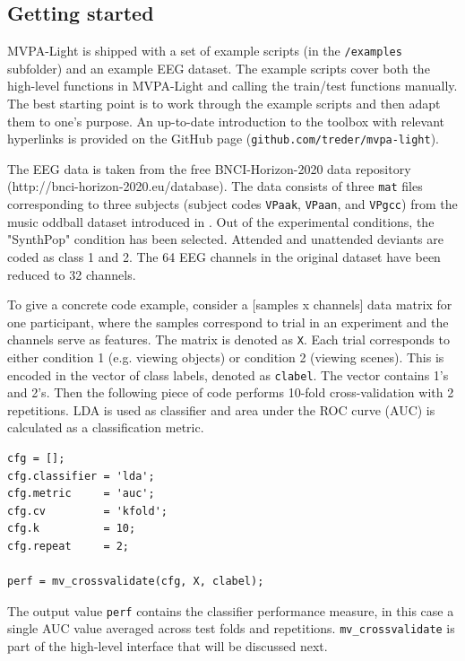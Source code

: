 \documentclass[utf8]{frontiersSCNS} %
\newcommand{\ttt}[1]{\texttt{#1}}
\begin{document}
\subsection{Getting started}

MVPA-Light is shipped with a set of example scripts (in the \ttt{/examples} subfolder) and an example EEG dataset. The example scripts cover both the high-level functions in MVPA-Light and calling the train/test functions manually. The best starting point is to work through the example scripts and then adapt them to one's purpose. An up-to-date introduction to the toolbox with relevant hyperlinks is provided on the GitHub page (\ttt{github.com/treder/mvpa-light}).

The EEG data is taken from the free BNCI-Horizon-2020 data repository (http://bnci-horizon-2020.eu/database). The data consists of three \ttt{mat} files corresponding to three subjects (subject codes \ttt{VPaak}, \ttt{VPaan}, and \ttt{VPgcc}) from the music oddball dataset introduced in \cite{Treder2014}. Out of the experimental conditions, the "SynthPop" condition has been selected. Attended and unattended deviants are coded as class 1 and 2. The 64 EEG channels in the original dataset have been reduced to 32 channels.

To give a concrete code example, consider a [samples x channels] data matrix for one participant, where the samples correspond to trial in an experiment and the channels serve as features. The matrix is denoted as \ttt{X}. Each trial corresponds to either condition 1 (e.g. viewing objects) or condition 2 (viewing scenes). This is encoded in the vector of class labels, denoted as \ttt{clabel}. The vector contains 1's and 2's. Then the following piece of code performs 10-fold cross-validation with 2 repetitions. LDA is used as classifier and area under the ROC curve (AUC) is calculated as a classification metric.

\begin{verbatim}
cfg = [];
cfg.classifier = 'lda';
cfg.metric     = 'auc';
cfg.cv         = 'kfold';
cfg.k          = 10;
cfg.repeat     = 2;

perf = mv_crossvalidate(cfg, X, clabel);
\end{verbatim}

The output value \ttt{perf} contains the classifier performance measure, in this case a single AUC value averaged across test folds and repetitions. \ttt{mv\_crossvalidate} is part of the high-level interface that will be discussed next.
\end{document}
